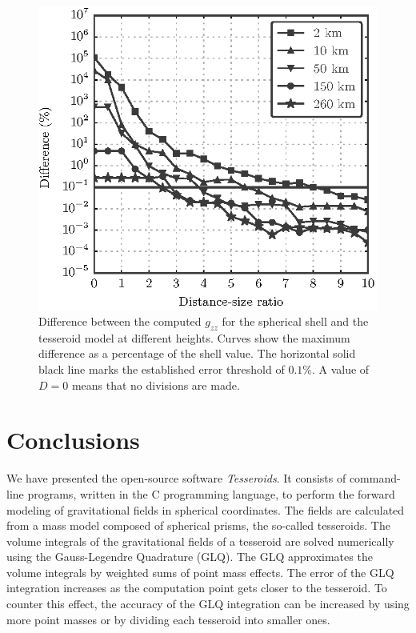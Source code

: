 \begin{figure}
    \centering
    \includegraphics{figures/paper-tesseroids/gzz-with-height}
    \caption{
        Difference between the computed $g_{zz}$ for the spherical shell and
        the tesseroid model at different heights. Curves show the maximum
        difference as a percentage of the shell value.
        The horizontal solid black line marks the established error threshold
        of $0.1\%$.
        A value of $D=0$ means that no divisions are made.
    }
    \label{fig:p2-gzz-with-height}
\end{figure}


\section{Conclusions}


We have presented the open-source software \emph{Tesseroids}.
It consists of command-line programs,
written in the C programming language,
to perform the forward modeling of gravitational fields in spherical
coordinates.
The fields are calculated from a mass model composed of spherical prisms, the
so-called tesseroids.
The volume integrals of the gravitational fields of a tesseroid are solved
numerically using the Gauss-Legendre Quadrature (GLQ).
The GLQ approximates the volume integrals by weighted sums of point mass
effects.
The error of the GLQ integration increases as the computation point gets closer
to the tesseroid.
To counter this effect,
the accuracy of the GLQ integration can be increased by using more point
masses or by dividing each tesseroid into smaller ones.


